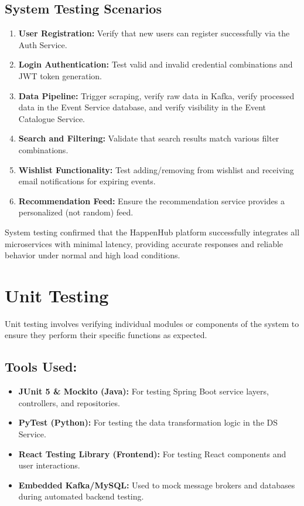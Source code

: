 \documentclass[12pt,a4paper]{report}
\begin{document}
\subsection*{System Testing Scenarios}
\begin{enumerate}
    \item \textbf{User Registration:} Verify that new users can register successfully via the Auth Service.
    \item \textbf{Login Authentication:} Test valid and invalid credential combinations and JWT token generation.
    \item \textbf{Data Pipeline:} Trigger scraping, verify raw data in Kafka, verify processed data in the Event Service database, and verify visibility in the Event Catalogue Service.
    \item \textbf{Search and Filtering:} Validate that search results match various filter combinations.
    \item \textbf{Wishlist Functionality:} Test adding/removing from wishlist and receiving email notifications for expiring events.
    \item \textbf{Recommendation Feed:} Ensure the recommendation service provides a personalized (not random) feed.
\end{enumerate}

\noindent
System testing confirmed that the HappenHub platform successfully integrates all microservices with minimal latency, providing accurate responses and reliable behavior under normal and high load conditions.

\section{Unit Testing}

Unit testing involves verifying individual modules or components of the system
to ensure they perform their specific functions as expected.

\subsection*{Tools Used:}
\begin{itemize}
    \item \textbf{JUnit 5 \& Mockito (Java):} For testing Spring Boot service layers, controllers, and repositories.
    \item \textbf{PyTest (Python):} For testing the data transformation logic in the DS Service.
    \item \textbf{React Testing Library (Frontend):} For testing React components and user interactions.
    \item \textbf{Embedded Kafka/MySQL:} Used to mock message brokers and databases during automated backend testing.
\end{itemize}
\end{document}
